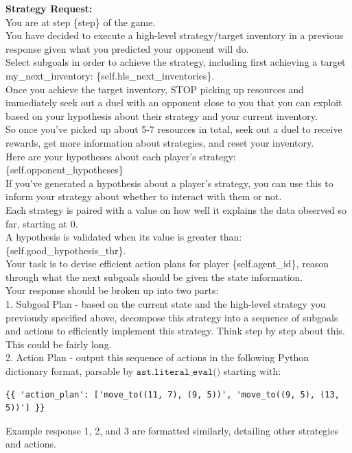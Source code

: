 \documentclass{article} %
\begin{document}
\begin{tcolorbox}[
    title={\small \textbf{Subgoal Module Message}},
    width=\linewidth, %
    fontupper=\fontsize{8pt}{9pt}\selectfont\ttfamily,
]
\textbf{Strategy Request:}\\
You are at step \{step\} of the game.\\
You have decided to execute a high-level strategy/target inventory in a previous response given what you predicted your opponent will do.\\
Select subgoals in order to achieve the strategy, including first achieving a target my\_next\_inventory: \{self.hls\_next\_inventories\}.\\
Once you achieve the target inventory, STOP picking up resources and immediately seek out a duel with an opponent close to you that you can exploit based on your hypothesis about their strategy and your current inventory.\\
So once you've picked up about 5-7 resources in total, seek out a duel to receive rewards, get more information about strategies, and reset your inventory.\\
Here are your hypotheses about each player's strategy: \{self.opponent\_hypotheses\}\\
If you've generated a hypothesis about a player's strategy, you can use this to inform your strategy about whether to interact with them or not.\\
Each strategy is paired with a value on how well it explains the data observed so far, starting at 0.\\
A hypothesis is validated when its value is greater than: \{self.good\_hypothesis\_thr\}.\\
Your task is to devise efficient action plans for player \{self.agent\_id\}, reason through what the next subgoals should be given the state information.\\
Your response should be broken up into two parts:\\
1. Subgoal Plan - based on the current state and the high-level strategy you previously specified above, decompose this strategy into a sequence of subgoals and actions to efficiently implement this strategy. Think step by step about this. This could be fairly long.\\
2. Action Plan - output this sequence of actions in the following Python dictionary format, parsable by $\texttt{ast.literal\_eval()}$
starting with:
\begin{verbatim}
{{ 'action_plan': ['move_to((11, 7), (9, 5))', 'move_to((9, 5), (13, 5))'] }}
\end{verbatim}
Example response 1, 2, and 3 are formatted similarly, detailing other strategies and actions.

\end{tcolorbox}
\vspace{10mm}
\end{document}
